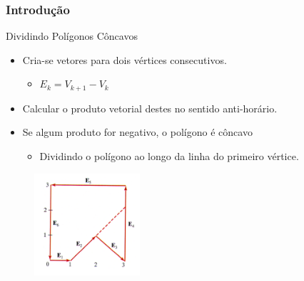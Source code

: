 \documentclass{beamer}
\begin{document}
\begin{frame}
\frametitle{Introdução}

		\begin{block}{Dividindo Polígonos Côncavos}
		\begin{itemize}
			\item Cria-se vetores para dois vértices consecutivos.
				\begin{itemize}
					\item $E_k = V_{k+1} - V_k$
				\end{itemize}
			\item Calcular o produto vetorial destes no sentido anti-horário.
			\item Se algum produto for negativo, o polígono é côncavo
				\begin{itemize}
					\item Dividindo o polígono ao longo da linha do primeiro vértice.
				\end{itemize}
		\end{itemize}
		\end{block}
		
		\begin{figure}[!h]
			\begin{center}
				\includegraphics[width=0.35\textwidth]{Figures/PolConVexDiv}
			\end{center}
		\end{figure}
	
\end{frame}

\end{document}
